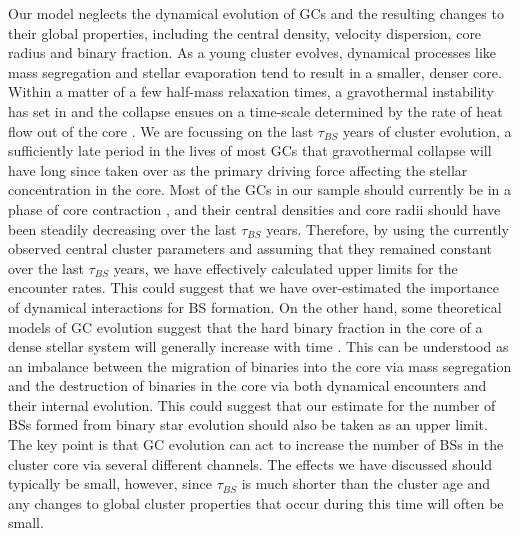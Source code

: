 Our model neglects the dynamical evolution of GCs and the resulting
changes to their global properties, including the central density,
velocity dispersion, core radius and binary fraction.  As a young
cluster evolves, dynamical processes like mass segregation and
stellar evaporation tend to result in a smaller, denser core.  Within
a matter of a few half-mass relaxation times, a gravothermal
instability has set in and the collapse ensues on a time-scale
determined by the rate of heat flow out of the core
\citep[e.g.][]{spitzer87}.  We are focussing 
on the last $\tau_{BS}$ years of cluster 
evolution, a sufficiently late period in the lives of most GCs
that gravothermal collapse will have long since taken over as the
primary driving force affecting the stellar concentration in the
core.  Most of the GCs in our sample should currently be in a phase
of core contraction \citep{fregeau09, gieles11}, and their central
densities and core radii should have been steadily
decreasing over the last $\tau_{BS}$ years.  Therefore, by using
the currently observed central cluster parameters and assuming that
they remained constant over the last
$\tau_{BS}$ years, we have effectively calculated upper limits for
the encounter rates.  This could suggest that we have over-estimated
the importance of dynamical interactions for BS formation.  On the
other hand, some theoretical
models of GC evolution suggest that the hard binary fraction in the
core of a dense stellar system will generally increase
with time \citep[e.g.][]{hurley05, fregeau09}.  This can be understood as an
imbalance between the migration of
binaries into the core via mass segregation and the destruction of
binaries in the core via both dynamical encounters and their internal
evolution.  This could suggest that our estimate for the number of BSs
formed from binary star evolution should also be taken as an upper
limit.  The key point is that GC evolution can act to
increase the number of BSs in the cluster core via several different
channels.  The effects we have discussed should typically be small,
however, since 
$\tau_{BS}$ is much shorter than the cluster age \citep{deangeli05}
and any changes to global cluster properties that occur during this
time will often be small.

